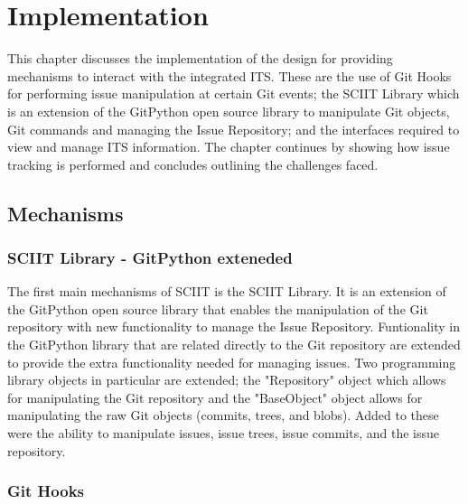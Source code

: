 \documentclass{mproj}
\begin{document}
\chapter{Implementation}\label{implementation}

This chapter discusses the implementation of the design for providing mechanisms to interact with the integrated ITS. These are the use of Git Hooks for performing issue manipulation at certain Git events; the SCIIT Library which is an extension of the GitPython open source library to manipulate Git objects, Git commands and managing the Issue Repository; and the interfaces required to view and manage ITS information. The chapter continues by showing how issue tracking is performed and concludes outlining the challenges faced.

\section{Mechanisms}

\subsection{SCIIT Library - GitPython exteneded}

The first main mechanisms of SCIIT is the SCIIT Library. It is an extension of the GitPython open source library that enables the manipulation of the Git repository with new functionality to manage the Issue Repository. Funtionality in the GitPython library that are related directly to the Git repository are extended to provide the extra functionality needed for managing issues. Two programming library objects in particular are extended; the "Repository" object which allows for manipulating the Git repository and the "BaseObject" object allows for manipulating the raw Git objects (commits, trees, and blobs). Added to these were the ability to manipulate issues, issue trees, issue commits, and the issue repository.


\subsection{Git Hooks}
\end{document}
